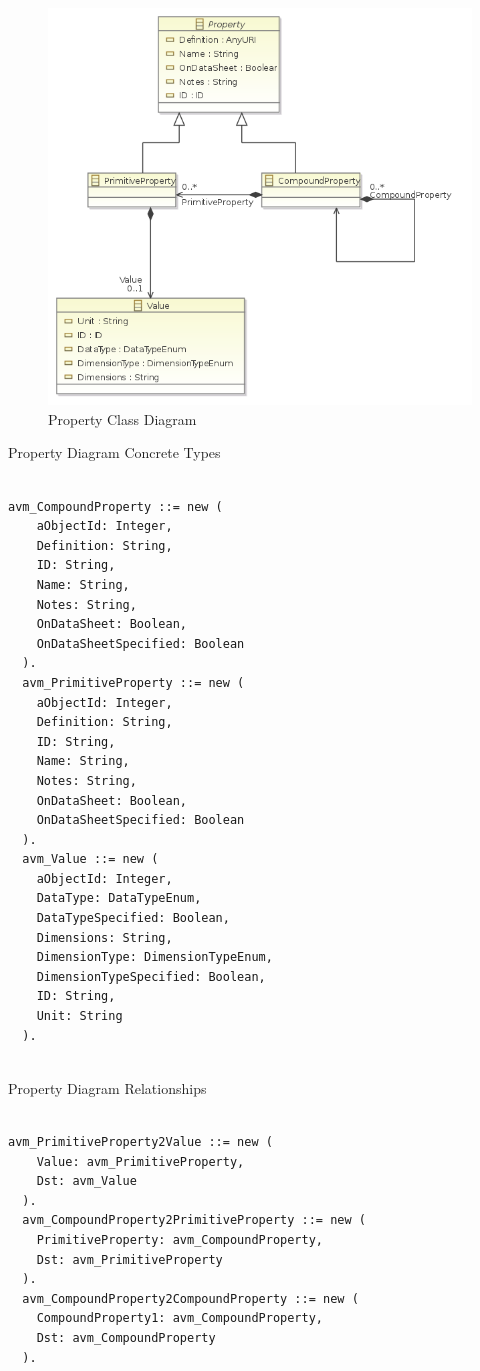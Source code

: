 \begin{figure}[H]
\centering
\includegraphics[width=\textwidth]{./AVM_Formal_Semantics/1}
\caption{Property Class Diagram}
\end{figure}

Property Diagram Concrete Types
\begin{lstlisting}

avm_CompoundProperty ::= new (
    aObjectId: Integer,
    Definition: String,
    ID: String,
    Name: String,
    Notes: String,
    OnDataSheet: Boolean,
    OnDataSheetSpecified: Boolean
  ).
  avm_PrimitiveProperty ::= new (
    aObjectId: Integer,
    Definition: String,
    ID: String,
    Name: String,
    Notes: String,
    OnDataSheet: Boolean,
    OnDataSheetSpecified: Boolean
  ).
  avm_Value ::= new (
    aObjectId: Integer,
    DataType: DataTypeEnum,
    DataTypeSpecified: Boolean,
    Dimensions: String,
    DimensionType: DimensionTypeEnum,
    DimensionTypeSpecified: Boolean,
    ID: String,
    Unit: String
  ).


\end{lstlisting}

Property Diagram Relationships
\begin{lstlisting}

avm_PrimitiveProperty2Value ::= new (
    Value: avm_PrimitiveProperty,
    Dst: avm_Value
  ).
  avm_CompoundProperty2PrimitiveProperty ::= new (
    PrimitiveProperty: avm_CompoundProperty,
    Dst: avm_PrimitiveProperty
  ).
  avm_CompoundProperty2CompoundProperty ::= new (
    CompoundProperty1: avm_CompoundProperty,
    Dst: avm_CompoundProperty
  ).


\end{lstlisting}


